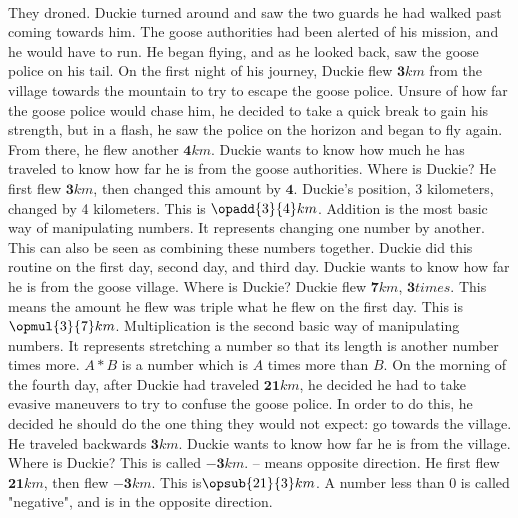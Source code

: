 \paragraph{} They droned. Duckie turned around and saw the two guards he had walked past coming towards him. The goose authorities had been alerted of his mission, and he would have to run. He began flying, and as he looked back, saw the goose police on his tail. 
\vfill
\pagebreak
{On the first night of his journey, Duckie flew $\mathbf{3} km$ from the village towards the mountain to try to escape the goose police. Unsure of how far the goose police would chase him, he decided to take a quick break to gain his strength, but in a flash, he saw the police on the horizon and began to fly again. From there, he flew another $\mathbf{4} km$. Duckie wants to know how much he has traveled to know how far he is from the goose authorities. Where is Duckie?}
{He first flew $\mathbf{3} km$, then changed this amount by $\mathbf{4}$. Duckie's position, 3 kilometers, changed by 4 kilometers. This is $\opadd{3}{4} km$.}
{Addition is the most basic way of manipulating numbers. It represents changing one number by another. This can also be seen as combining these numbers together.} 
{}
{Duckie did this routine on the first day, second day, and third day.  Duckie wants to know how far he is from the goose village. Where is Duckie?}
{Duckie flew $\mathbf{7} km$, $\mathbf{3} times$. This means the amount he flew was triple what he flew on the first day. This is $\opmul{3}{7} km$.}
{Multiplication is the second basic way of manipulating numbers. It represents stretching a number so that its length is another number times more. $A\ast B$ is a number which is $A$ times more than $B$.}
{}
{On the morning of the fourth day, after Duckie had traveled $\mathbf{21} km$, he decided he had to take evasive maneuvers to try to confuse the goose police. In order to do this, he decided he should do the one thing they would not expect: go towards the village. He traveled backwards $\mathbf{3} km$. Duckie wants to know how far he is from the village. Where is Duckie?}
{This is called $\mathbf{-3} km$. \linebreak – means opposite direction.  He first flew $\mathbf{21} km$, then flew $\mathbf{-3} km$. This is$ \opsub{21}{3} km$.}
{A number less than 0 is called "negative", and is in the opposite direction. }
